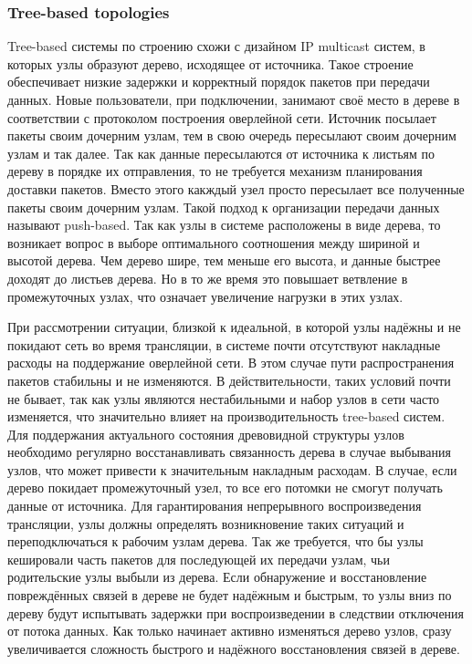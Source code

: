 		\subsubsection{Tree-based topologies}
		Tree-based системы по строению схожи с дизайном IP multicast систем, в которых узлы образуют дерево, исходящее
		от источника. Такое строение обеспечивает низкие задержки и корректный порядок пакетов при передачи данных.
		Новые пользователи, при подключении, занимают своё место в дереве в соответствии с протоколом построения
		оверлейной сети. Источник посылает пакеты своим дочерним узлам, тем в свою очередь пересылают своим дочерним
		узлам и так далее. Так как данные пересылаются от источника к листьям по дереву в порядке их отправления, то не
		требуется механизм планирования доставки пакетов. Вместо этого какждый узел просто пересылает все полученные
		пакеты своим дочерним узлам. Такой подход к организации передачи данных называют push-based. Так как
		узлы в системе расположены в виде дерева, то возникает вопрос в выборе оптимального соотношения между шириной и
		высотой дерева. Чем дерево шире, тем меньше его высота, и данные быстрее доходят до листьев дерева. Но в то же
		время это повышает ветвление в промежуточных узлах, что означает увеличение нагрузки в этих узлах.

		При рассмотрении ситуации, близкой к идеальной, в которой узлы надёжны и не покидают сеть во время трансляции,
		в системе почти отсутствуют накладные расходы на поддержание оверлейной сети. В этом случае пути распространения
		пакетов стабильны и не изменяются. В действительности, таких условий почти не бывает, так как узлы являются
		нестабильными и набор узлов в сети часто изменяется, что значительно влияет на производительность tree-based
		систем. Для поддержания актуального состояния древовидной структуры узлов необходимо регулярно восстанавливать
		связанность дерева в случае выбывания узлов, что может привести к значительным накладным расходам. В случае,
		если дерево покидает промежуточный узел, то все его потомки не смогут получать данные от источника. Для
		гарантирования непрерывного воспроизведения трансляции, узлы должны определять возникновение таких ситуаций и
		переподключаться к рабочим узлам дерева. Так же требуется, что бы узлы кешировали часть пакетов для последующей
		их передачи узлам, чьи родительские узлы выбыли из дерева. Если обнаружение и восстановление повреждённых связей
		в дереве не будет надёжным и быстрым, то узлы вниз по дереву будут испытывать задержки при воспроизведении в
		следствии отключения от потока данных. Как только начинает активно изменяться дерево узлов, сразу увеличивается
		сложность быстрого и надёжного восстановления связей в дереве.


